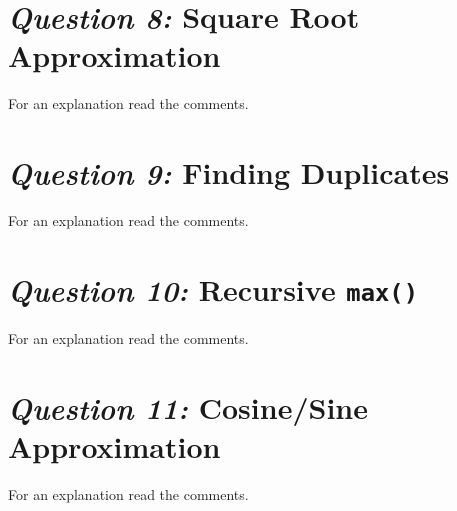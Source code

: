 \documentclass[12pt]{article}
\begin{document}
\section{\textit{Question 8:} Square Root Approximation}

For an explanation read the comments.







\section{\textit{Question 9:} Finding Duplicates}

For an explanation read the comments.







\section{\textit{Question 10:} Recursive \texttt{max()}}

For an explanation read the comments.







\section{\textit{Question 11:} Cosine/Sine Approximation}

For an explanation read the comments.


\end{document}
